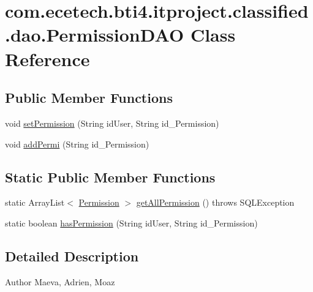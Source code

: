 \hypertarget{classcom_1_1ecetech_1_1bti4_1_1itproject_1_1classified_1_1dao_1_1_permission_d_a_o}{}\section{com.\+ecetech.\+bti4.\+itproject.\+classified.\+dao.\+Permission\+D\+AO Class Reference}
\label{classcom_1_1ecetech_1_1bti4_1_1itproject_1_1classified_1_1dao_1_1_permission_d_a_o}
\subsection*{Public Member Functions}
\begin{DoxyCompactItemize}
\item 
void \hyperlink{classcom_1_1ecetech_1_1bti4_1_1itproject_1_1classified_1_1dao_1_1_permission_d_a_o_a28a8d3624982b88f1dbf5849a82ac68a}{set\+Permission} (String id\+User, String id\+\_\+\+Permission)
\item 
void \hyperlink{classcom_1_1ecetech_1_1bti4_1_1itproject_1_1classified_1_1dao_1_1_permission_d_a_o_a144b1554142b1056f87331a20784ee15}{add\+Permi} (String id\+\_\+\+Permission)
\end{DoxyCompactItemize}
\subsection*{Static Public Member Functions}
\begin{DoxyCompactItemize}
\item 
static Array\+List$<$ \hyperlink{classcom_1_1ecetech_1_1bti4_1_1itproject_1_1classified_1_1beans_1_1_permission}{Permission} $>$ \hyperlink{classcom_1_1ecetech_1_1bti4_1_1itproject_1_1classified_1_1dao_1_1_permission_d_a_o_a35a54106c07cc5bb23e1b2c250f60b08}{get\+All\+Permission} ()  throws S\+Q\+L\+Exception 
\item 
static boolean \hyperlink{classcom_1_1ecetech_1_1bti4_1_1itproject_1_1classified_1_1dao_1_1_permission_d_a_o_a8f378b17fd7afa2048c46cf6566a3dd9}{has\+Permission} (String id\+User, String id\+\_\+\+Permission)
\end{DoxyCompactItemize}


\subsection{Detailed Description}
\begin{DoxyAuthor}{Author}
Maeva, Adrien, Moaz 
\end{DoxyAuthor}


